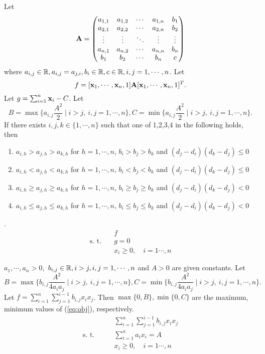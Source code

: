 \documentclass{llncs}
\begin{document}
\begin{theorem}
	Let 
\[\AA = 
\begin{pmatrix}
	a_{1,1} & a_{1,2} & \cdots & a_{1,n}& b_1 \\
	a_{2,1} & a_{2,2} & \cdots & a_{2,n}& b_2 \\
	\vdots  & \vdots  & \ddots & \vdots & \vdots \\
	a_{n,1} & a_{n,2} & \cdots & a_{n,n}& b_n  \\
	b_1     &  b_2    &  \cdots&   b_n  & c
\end{pmatrix}\]
where $a_{i,j} \in \RR, a_{i,j}=a_{j,i}, b_i\in \RR, c\in \RR, i,j=1,\cdots, n $. Let \[f=[\xx_1,\cdots, \xx_n,1]\AA[\xx_1,\cdots, \xx_n, 1]^T.\] 
Let $g=\sum_{i=1}^n\xx_i-C$. 
Let \[
B=\max\{a_{i,j}\frac{A^2}{2}  \mid i> j,\ i,j=1,\cdots,n \}, C=\min\{a_{i,j}\frac{A^2}{2}  \mid i> j,\ i,j=1,\cdots,n \}.\]  
If there exists $i,j,k\in \{1,\cdots, n\}$ such that
one of 1,2,3,4  in the following holds, then 
\begin{enumerate}
		\item  $a_{i,h}>a_{j,h}>a_{k,h}$ for $h=1,\cdots, n$, $b_{i}>b_{j}>b_{k}$ and $(d_j-d_i)(d_k-d_j)\le 0$
		\item  $a_{i,h}<a_{j,h}<a_{k,h}$ for $h=1,\cdots, n$, $b_{i}<b_{j}<b_{k}$ and $(d_j-d_i)(d_k-d_j)\le 0$
		\item  $a_{i,h}\ge a_{j,h}\ge a_{k,h}$ for $h=1,\cdots, n$, $b_{i}\ge b_{j}\ge b_{k}$ and $(d_j-d_i)(d_k-d_j)< 0$
		\item  $a_{i,h}\le a_{j,h}\le a_{k,h}$ for $h=1,\cdots, n$, $b_{i}\le b_{j}\le b_{k}$ and $(d_j-d_i)(d_k-d_j)< 0$
\end{enumerate}

.
	\begin{align}
&f \label{eq:obj4}\\
\mbox{s.\ t.}\quad &g=0 \nonumber\\
& x_i\ge 0,\quad i=1\cdots,n \nonumber
\end{align}

  $a_1,\cdots,a_n>0,$ $b_{i,j}\in \RR, i> j, i,j =1,\cdots, n$
	and $A>0$ are given constants.   Let \[
	 B=\max\{b_{i,j}\frac{A^2}{4a_{i}a_{j}}  \mid i> j,\ i,j=1,\cdots,n \}, C=\min\{b_{i,j}\frac{A^2}{4a_{i}a_{j}}  \mid i> j,\ i,j=1,\cdots,n \}.\]  
	 Let $f=\sum_{i=1}^n\sum_{j=1}^{i-1}b_{i,j}x_{i}x_{j}$.
	 Then $ \max\{0,B\}, \min\{0,C\}$ are the maximum, minimum values of (\ref{eq:obj}), respectively.
	 	\begin{align}
	 	&\sum_{i=1}^n\sum_{j=1}^{i-1}b_{i,j}x_{i}x_{j}  \label{eq:obj}\\
	 	\mbox{s.\ t.}\qquad	&\sum_{i=1}^na_ix_i=A \nonumber\\
	 	& x_i\ge 0,\quad i=1\cdots,n \nonumber
	 	\end{align}
%	 	
\end{theorem}
\end{document}
